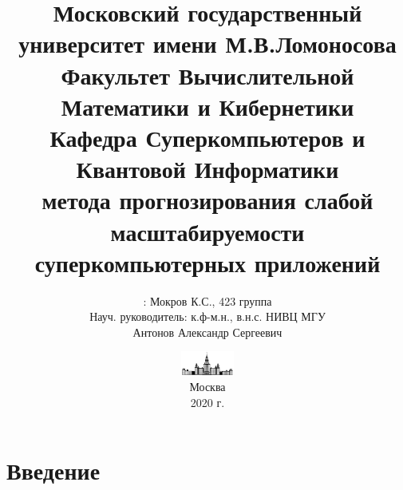 \documentclass[unicode, t, 11pt]{beamer}%
\title{
	{\footnotesize\color{black}Московский государственный университет имени М.В.Ломоносова\\
    Факультет Вычислительной Математики и Кибернетики\\
    Кафедра Суперкомпьютеров и Квантовой Информатики\\}
    \vspace{\baselineskip}
    {\LARGEРазработка метода прогнозирования слабой масштабируемости суперкомпьютерных приложений}
}
\author{\footnotesizeСтудент: Мокров К.С., 423 группа\\
		Науч. руководитель: к.ф-м.н.,
		в.н.с. НИВЦ МГУ\\
		Антонов Александр Сергеевич}
\date{\includegraphics[height=0.8cm]{./images/MSU}\\
	  \scriptsize
	  Москва\\
	  2020 г.}
\begin{document}
	\frame[plain]{\titlepage}  %
	
	\section{Введение}
		\begin{frame}
			\frametitle{\insertsection}
			\begin{itemize}[label = \(\bullet\)]



\end{itemize}
\end{frame}
\end{document}
